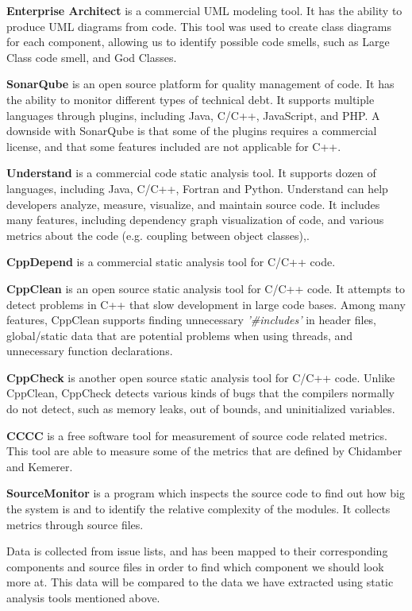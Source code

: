 \textbf{Enterprise Architect} is a commercial UML modeling tool. It has the ability to produce UML diagrams from code. This tool was used to create class diagrams for each component, allowing us to identify possible code smells, such as Large Class code smell, and God Classes.

\textbf{SonarQube} is an open source platform for quality management of code. It has the ability to monitor different types of technical debt. It supports multiple languages through plugins, including Java, C/C++, JavaScript, and PHP. A downside with SonarQube is that some of the plugins requires a commercial license, and that some features included are not applicable for C++.

\textbf{Understand}  is a commercial code static analysis tool. It supports dozen of languages, including Java, C/C++, Fortran and Python. Understand can help developers analyze, measure, visualize, and maintain source code. It includes many features, including dependency graph visualization of code, and various metrics about the code (e.g. coupling between object classes),. 

\textbf{CppDepend} is a commercial static analysis tool for C/C++ code. 

\textbf{CppClean} is an open source static analysis tool for C/C++ code. It attempts to detect problems in C++ that slow development in large code bases. Among many features, CppClean supports finding unnecessary \textit{'\#includes'} in header files, global/static data that are potential problems when using threads, and unnecessary function declarations.

\textbf{CppCheck} is another open source static analysis tool for C/C++ code. Unlike CppClean, CppCheck detects various kinds of bugs that the compilers normally do not detect, such as memory leaks, out of bounds, and uninitialized variables.

\textbf{CCCC} is a free software tool for measurement of source code related metrics. This tool are able to measure some of the metrics that are defined by Chidamber and Kemerer\cite{chidamber1994metrics}.

\textbf{SourceMonitor} is a program which inspects the source code to find out how big the system is and to identify the relative complexity of the modules. It collects metrics through source files.

Data is collected from issue lists, and has been mapped to their corresponding components and source files in order to find which component we should look more at. This data will be compared to the data we have extracted using static analysis tools mentioned above.


